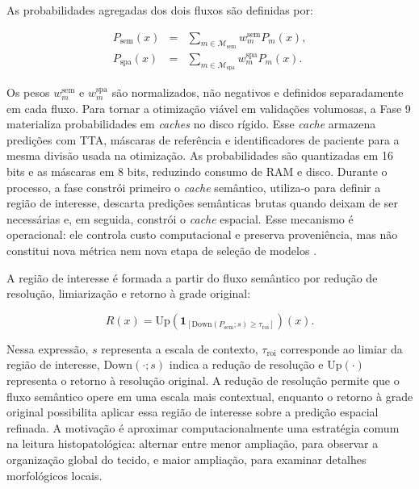 As probabilidades
agregadas dos dois fluxos são definidas por:

\begin{equation}
\begin{array}{rcl}
P_{\mathrm{sem}}(x) &=&
\sum_{m\in\mathcal{M}_{\mathrm{sem}}} w_m^{\mathrm{sem}}P_m(x),\\[0.6em]
P_{\mathrm{spa}}(x) &=&
\sum_{m\in\mathcal{M}_{\mathrm{spa}}} w_m^{\mathrm{spa}}P_m(x).
\end{array}
\label{eq:streams}
\end{equation}

Os pesos $w_m^{\mathrm{sem}}$ e $w_m^{\mathrm{spa}}$ são normalizados,
não negativos e definidos separadamente em cada fluxo. Para tornar a otimização viável em validações volumosas, a Fase 9 materializa probabilidades em \textit{caches} no disco rígido. Esse \textit{cache} armazena predições
com TTA, máscaras de referência e identificadores de paciente para a mesma
divisão usada na otimização. As probabilidades são quantizadas em 16 bits e as
máscaras em 8 bits, reduzindo consumo de RAM e disco. Durante o processo, a
fase constrói primeiro o \textit{cache} semântico, utiliza-o para definir a região de
interesse, descarta predições semânticas brutas quando deixam de ser necessárias
e, em seguida, constrói o \textit{cache} espacial. Esse mecanismo é operacional: ele
controla custo computacional e preserva proveniência, mas não constitui nova
métrica nem nova etapa de seleção de modelos
\cite{wilkinson2016fair,piccolo2016tools}.

A região de interesse é formada a partir do fluxo semântico por redução de
resolução, limiarização e retorno à grade original:

\begin{equation}
    R(x)=
    \mathrm{Up}
    \left(
    \mathbf{1}_{[
    \mathrm{Down}(P_{\mathrm{sem}};s)\ge\tau_{\mathrm{roi}}
    ]}
    \right)(x).
    \label{eq:roi_gate}
\end{equation}

Nessa expressão, $s$ representa a escala de contexto, $\tau_{\mathrm{roi}}$
corresponde ao limiar da região de interesse, $\mathrm{Down}(\cdot;s)$ indica a
redução de resolução e $\mathrm{Up}(\cdot)$ representa o retorno à resolução
original. A redução de resolução permite que o fluxo semântico opere em uma
escala mais contextual, enquanto o retorno à grade original possibilita aplicar
essa região de interesse sobre a predição espacial refinada. A motivação é aproximar computacionalmente uma estratégia comum na leitura
histopatológica: alternar entre menor ampliação, para observar a organização
global do tecido, e maior ampliação, para examinar detalhes morfológicos locais.

